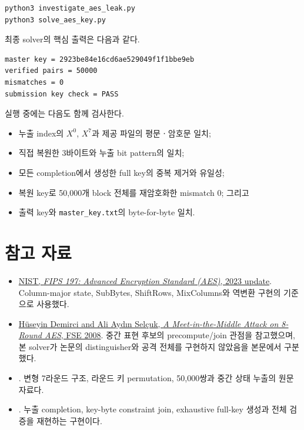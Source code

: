 \documentclass[10pt,a4paper]{article}
\begin{document}
\begin{lstlisting}
python3 investigate_aes_leak.py
python3 solve_aes_key.py
\end{lstlisting}

최종 solver의 핵심 출력은 다음과 같다.

\begin{lstlisting}
master key = 2923be84e16cd6ae529049f1f1bbe9eb
verified pairs = 50000
mismatches = 0
submission key check = PASS
\end{lstlisting}

실행 중에는 다음도 함께 검사한다.

\begin{itemize}
  \item 누출 index의 $X^0$, $X^7$과 제공 파일의 평문ㆍ암호문 일치;
  \item 직접 복원한 3바이트와 누출 bit pattern의 일치;
  \item 모든 completion에서 생성한 full key의 중복 제거와 유일성;
  \item 복원 key로 50,000개 block 전체를 재암호화한 mismatch 0; 그리고
  \item 출력 key와 \texttt{master\_key.txt}의
        byte-for-byte 일치.
\end{itemize}

\section{참고 자료}

\begin{itemize}
  \item \href{https://doi.org/10.6028/NIST.FIPS.197-upd1}
        {NIST, \emph{FIPS 197: Advanced Encryption Standard (AES)},
        2023 update}. Column-major state, SubBytes, ShiftRows, MixColumns와
        역변환 구현의 기준으로 사용했다.
  \item \href{https://www.iacr.org/archive/fse2008/50860106/50860106.pdf}
        {{\latinfont Hüseyin Demirci and Ali Aydın Selçuk},
        \emph{A Meet-in-the-Middle Attack on 8-Round AES}, FSE 2008}.
        중간 표현 후보의 precompute/join 관점을 참고했으며, 본 solver가
        논문의 distinguisher와 공격 전체를 구현하지 않았음을 본문에서
        구분했다.
  \item {}. 변형 7라운드 구조, 라운드 키
        permutation, 50,000쌍과 중간 상태 누출의 원문 자료다.
  \item {}. 누출 completion,
        key-byte constraint join, exhaustive full-key 생성과 전체 검증을
        재현하는 구현이다.
\end{itemize}
\end{document}
